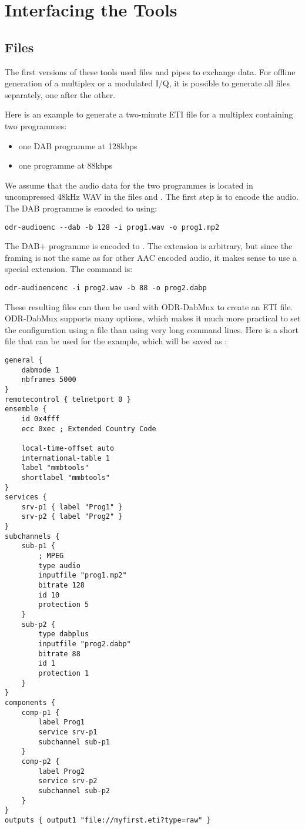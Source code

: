 \section{Interfacing the Tools}
\subsection{Files}
\label{sec-files}
The first versions of these tools used files and pipes to exchange data. For
offline generation of a multiplex or a modulated I/Q, it is possible to
generate all files separately, one after the other.

Here is an example to generate a two-minute ETI file for a multiplex containing
two programmes:
\begin{itemize}
    \item one DAB programme at 128kbps
    \item one \dabplus{} programme at 88kbps
\end{itemize}

We assume that the audio data for the two programmes is located in uncompressed
48kHz WAV in the files  and . The first step
is to encode the audio. The DAB programme is encoded to  using:
\begin{lstlisting}
odr-audioenc --dab -b 128 -i prog1.wav -o prog1.mp2
\end{lstlisting}

The DAB+ programme is encoded to . The extension
 is arbitrary, but since the framing is not the same as for
other AAC encoded audio, it makes sense to use a special extension. The command
is:
\begin{lstlisting}
odr-audioencenc -i prog2.wav -b 88 -o prog2.dabp
\end{lstlisting}

These resulting files can then be used with ODR-DabMux to create an ETI file.
ODR-DabMux supports many options, which makes it much more practical to set
the configuration using a file than using very long command lines. Here is a short
file that can be used for the example, which will be saved as :
\begin{lstlisting}
general {
    dabmode 1
    nbframes 5000
}
remotecontrol { telnetport 0 }
ensemble {
    id 0x4fff
    ecc 0xec ; Extended Country Code

    local-time-offset auto
    international-table 1
    label "mmbtools"
    shortlabel "mmbtools"
}
services {
    srv-p1 { label "Prog1" }
    srv-p2 { label "Prog2" }
}
subchannels {
    sub-p1 {
        ; MPEG
        type audio
        inputfile "prog1.mp2"
        bitrate 128
        id 10
        protection 5
    }
    sub-p2 {
        type dabplus
        inputfile "prog2.dabp"
        bitrate 88
        id 1
        protection 1
    }
}
components {
    comp-p1 {
        label Prog1
        service srv-p1
        subchannel sub-p1
    }
    comp-p2 {
        label Prog2
        service srv-p2
        subchannel sub-p2
    }
}
outputs { output1 "file://myfirst.eti?type=raw" }
\end{lstlisting}

